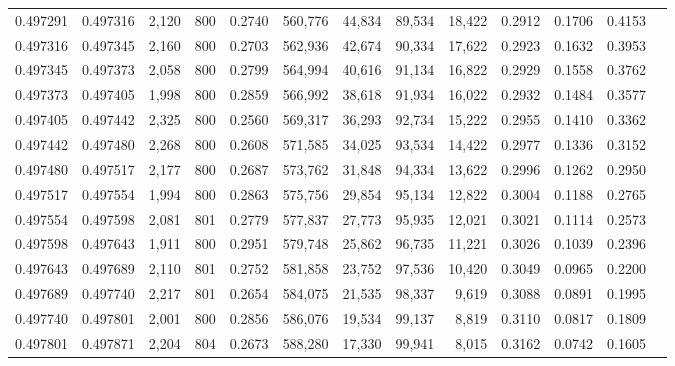 \begin{tabular}{rrrrrrrrrrrrr}
0.497291 & 0.497316 &  2,120 & 800 &                                     0.2740 & 560,776 &  44,834 &  89,534 &  18,422 & 0.2912 & 0.1706 & 0.4153 \\
0.497316 & 0.497345 &  2,160 & 800 &                                     0.2703 & 562,936 &  42,674 &  90,334 &  17,622 & 0.2923 & 0.1632 & 0.3953 \\
0.497345 & 0.497373 &  2,058 & 800 &                                     0.2799 & 564,994 &  40,616 &  91,134 &  16,822 & 0.2929 & 0.1558 & 0.3762 \\
0.497373 & 0.497405 &  1,998 & 800 &                                     0.2859 & 566,992 &  38,618 &  91,934 &  16,022 & 0.2932 & 0.1484 & 0.3577 \\
0.497405 & 0.497442 &  2,325 & 800 &                                     0.2560 & 569,317 &  36,293 &  92,734 &  15,222 & 0.2955 & 0.1410 & 0.3362 \\
0.497442 & 0.497480 &  2,268 & 800 &                                     0.2608 & 571,585 &  34,025 &  93,534 &  14,422 & 0.2977 & 0.1336 & 0.3152 \\
0.497480 & 0.497517 &  2,177 & 800 &                                     0.2687 & 573,762 &  31,848 &  94,334 &  13,622 & 0.2996 & 0.1262 & 0.2950 \\
0.497517 & 0.497554 &  1,994 & 800 &                                     0.2863 & 575,756 &  29,854 &  95,134 &  12,822 & 0.3004 & 0.1188 & 0.2765 \\
0.497554 & 0.497598 &  2,081 & 801 &                                     0.2779 & 577,837 &  27,773 &  95,935 &  12,021 & 0.3021 & 0.1114 & 0.2573 \\
0.497598 & 0.497643 &  1,911 & 800 &                                     0.2951 & 579,748 &  25,862 &  96,735 &  11,221 & 0.3026 & 0.1039 & 0.2396 \\
0.497643 & 0.497689 &  2,110 & 801 &                                     0.2752 & 581,858 &  23,752 &  97,536 &  10,420 & 0.3049 & 0.0965 & 0.2200 \\
0.497689 & 0.497740 &  2,217 & 801 &                                     0.2654 & 584,075 &  21,535 &  98,337 &   9,619 & 0.3088 & 0.0891 & 0.1995 \\
0.497740 & 0.497801 &  2,001 & 800 &                                     0.2856 & 586,076 &  19,534 &  99,137 &   8,819 & 0.3110 & 0.0817 & 0.1809 \\
0.497801 & 0.497871 &  2,204 & 804 &                                     0.2673 & 588,280 &  17,330 &  99,941 &   8,015 & 0.3162 & 0.0742 & 0.1605 \\

\end{tabular}
